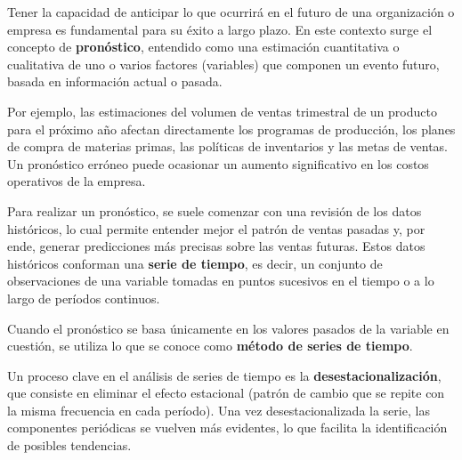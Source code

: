Tener la capacidad de anticipar lo que ocurrirá en el futuro de una organización
o empresa es fundamental para su éxito a largo plazo.
En este contexto surge el concepto de \textbf{pronóstico}, entendido como una
estimación cuantitativa o cualitativa de uno o varios factores (variables) que
componen un evento futuro, basada en información actual o pasada.

Por ejemplo, las estimaciones del volumen de ventas trimestral de un producto
para el próximo año afectan directamente los programas de producción, los planes
de compra de materias primas, las políticas de inventarios y las metas de
ventas.
Un pronóstico erróneo puede ocasionar un aumento significativo en los costos
operativos de la empresa.

Para realizar un pronóstico, se suele comenzar con una revisión de los datos
históricos, lo cual permite entender mejor el patrón de ventas pasadas y, por
ende, generar predicciones más precisas sobre las ventas futuras.
Estos datos históricos conforman una \textbf{serie de tiempo}, es decir, un
conjunto de observaciones de una variable tomadas en puntos sucesivos en el
tiempo o a lo largo de períodos continuos.

Cuando el pronóstico se basa únicamente en los valores pasados de la variable en
cuestión, se utiliza lo que se conoce como \textbf{método de series de tiempo}.

Un proceso clave en el análisis de series de tiempo es la
\textbf{desestacionalización}, que consiste en eliminar el efecto estacional
(patrón de cambio que se repite con la misma frecuencia en cada período).
Una vez desestacionalizada la serie, las componentes periódicas se vuelven más
evidentes, lo que facilita la identificación de posibles tendencias.
